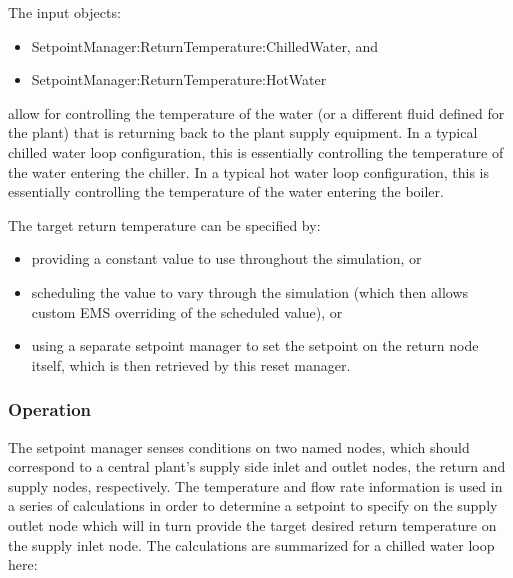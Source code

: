 The input objects:

\begin{itemize}
\item
  SetpointManager:ReturnTemperature:ChilledWater, and
\item
  SetpointManager:ReturnTemperature:HotWater
\end{itemize}

allow for controlling the temperature of the water (or a different fluid defined for the plant) that is returning back to the plant supply equipment. In a typical chilled water loop configuration, this is essentially controlling the temperature of the water entering the chiller. In a typical hot water loop configuration, this is essentially controlling the temperature of the water entering the boiler.

The target return temperature can be specified by:

\begin{itemize}
\item
  providing a constant value to use throughout the simulation, or
\item
  scheduling the value to vary through the simulation (which then allows custom EMS overriding of the scheduled value), or
\item
  using a separate setpoint manager to set the setpoint on the return node itself, which is then retrieved by this reset manager.
\end{itemize}

\subsubsection{Operation}\label{operation}

The setpoint manager senses conditions on two named nodes, which should correspond to a central plant's supply side inlet and outlet nodes, the return and supply nodes, respectively. The temperature and flow rate information is used in a series of calculations in order to determine a setpoint to specify on the supply outlet node which will in turn provide the target desired return temperature on the supply inlet node. The calculations are summarized for a chilled water loop here:

